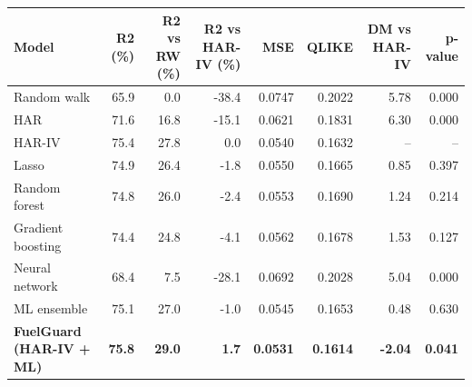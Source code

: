 \begin{tabular}{lrrrrrrr}
\toprule
Model & R2 (\%) & R2 vs RW (\%) & R2 vs HAR-IV (\%) & MSE & QLIKE & DM vs HAR-IV & p-value \\
\midrule
Random walk & 65.9 & 0.0 & -38.4 & 0.0747 & 0.2022 & 5.78 & 0.000 \\
HAR & 71.6 & 16.8 & -15.1 & 0.0621 & 0.1831 & 6.30 & 0.000 \\
HAR-IV & 75.4 & 27.8 & 0.0 & 0.0540 & 0.1632 & -- & -- \\
Lasso & 74.9 & 26.4 & -1.8 & 0.0550 & 0.1665 & 0.85 & 0.397 \\
Random forest & 74.8 & 26.0 & -2.4 & 0.0553 & 0.1690 & 1.24 & 0.214 \\
Gradient boosting & 74.4 & 24.8 & -4.1 & 0.0562 & 0.1678 & 1.53 & 0.127 \\
Neural network & 68.4 & 7.5 & -28.1 & 0.0692 & 0.2028 & 5.04 & 0.000 \\
ML ensemble & 75.1 & 27.0 & -1.0 & 0.0545 & 0.1653 & 0.48 & 0.630 \\
\textbf{FuelGuard (HAR-IV + ML)} & \textbf{75.8} & \textbf{29.0} & \textbf{1.7} & \textbf{0.0531} & \textbf{0.1614} & \textbf{-2.04} & \textbf{0.041} \\
\bottomrule
\end{tabular}
